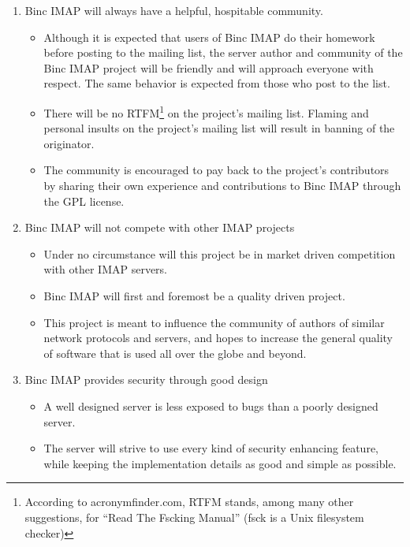 \documentclass[11pt,a4paper,twoside,openright]{report}
\begin{document}
\begin{enumerate}
\item Binc IMAP will always have a helpful, hospitable community.
  \begin {itemize}
  \item Although it is expected that users of Binc IMAP do their
  homework before posting to the mailing list, the server author and
  community of the Binc IMAP project will be friendly and will
  approach everyone with respect. The same behavior is expected from
  those who post to the list.

  \item There will be no RTFM\footnote{According to acronymfinder.com,
  RTFM stands, among many other suggestions, for ``Read The Fscking
  Manual'' (fsck is a Unix filesystem checker)} on the project's
  mailing list. Flaming and personal insults on the project's mailing
  list will result in banning of the originator.

  \item The community is encouraged to pay back to the project's
  contributors by sharing their own experience and contributions to
  Binc IMAP through the GPL license.
  \end{itemize}

\item Binc IMAP will not compete with other IMAP projects
  \begin{itemize}
  \item Under no circumstance will this project be in market driven
  competition with other IMAP servers.

  \item Binc IMAP will first and foremost be a quality driven project.

  \item This project is meant to influence the community of authors of
  similar network protocols and servers, and hopes to increase the
  general quality of software that is used all over the globe and
  beyond.
  \end{itemize}

\item Binc IMAP provides security through good design
  \begin{itemize}
  \item A well designed server is less exposed to bugs than a poorly
  designed server.

  \item The server will strive to use every kind of security enhancing
  feature, while keeping the implementation details as good and simple
  as possible.


\end{itemize}
\end{enumerate}
\end{document}
